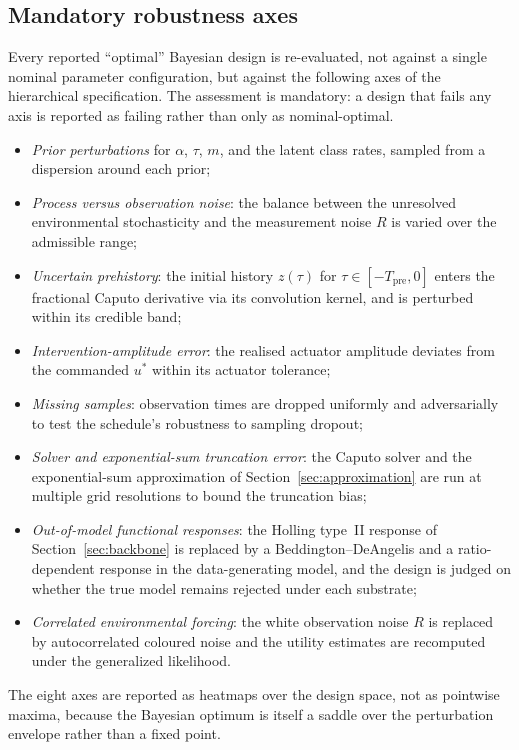 \subsection{Mandatory robustness axes}
\label{subsec:bayes:robust}

Every reported ``optimal'' Bayesian design is re-evaluated, not against a single nominal parameter configuration, but against the following axes of the hierarchical specification. The assessment is mandatory: a design that fails any axis is reported as failing rather than only as nominal-optimal.
\begin{itemize}
\item \emph{Prior perturbations} for $\alpha$, $\tau$, $m$, and the latent class rates, sampled from a dispersion around each prior;
\item \emph{Process versus observation noise}: the balance between the unresolved environmental stochasticity and the measurement noise $R$ is varied over the admissible range;
\item \emph{Uncertain prehistory}: the initial history $z(\tau)$ for $\tau \in [-T_{\mathrm{pre}}, 0]$ enters the fractional Caputo derivative via its convolution kernel, and is perturbed within its credible band;
\item \emph{Intervention-amplitude error}: the realised actuator amplitude deviates from the commanded $u^{*}$ within its actuator tolerance;
\item \emph{Missing samples}: observation times are dropped uniformly and adversarially to test the schedule's robustness to sampling dropout;
\item \emph{Solver and exponential-sum truncation error}: the Caputo solver and the exponential-sum approximation of Section~\ref{sec:approximation} are run at multiple grid resolutions to bound the truncation bias;
\item \emph{Out-of-model functional responses}: the Holling type~II response of Section~\ref{sec:backbone} is replaced by a Beddington--DeAngelis and a ratio-dependent response in the data-generating model, and the design is judged on whether the true model remains rejected under each substrate;
\item \emph{Correlated environmental forcing}: the white observation noise $R$ is replaced by autocorrelated coloured noise and the utility estimates are recomputed under the generalized likelihood.
\end{itemize}
The eight axes are reported as heatmaps over the design space, not as pointwise maxima, because the Bayesian optimum is itself a saddle over the perturbation envelope rather than a fixed point.


